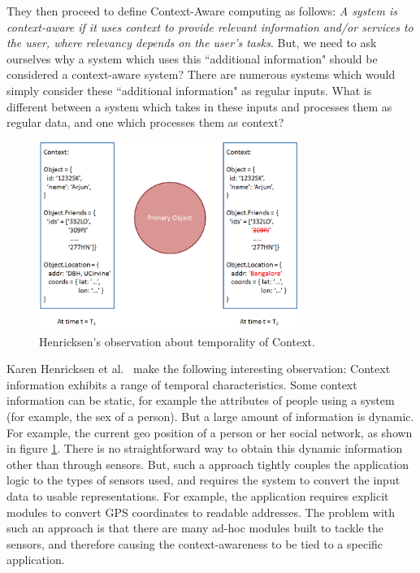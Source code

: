 They then proceed to define Context-Aware computing as follows: \textit{A system is context-aware if it uses context to provide relevant information and/or services to the user, where relevancy depends on the user's tasks}. But, we need to ask ourselves why a system which uses this ``additional information" should be considered a context-aware system? There are numerous systems which would simply consider these ``additional information" as regular inputs. What is different between a system which takes in these inputs and processes them as regular data, and one which processes them as context?

\begin{figure}[t]
\centering
\includegraphics[width=0.75\textwidth]{media/chapter2/ka-obs.png}
\caption{Henricksen's observation about temporality of Context.}
\label{fig:karen-obs}
\end{figure}

Karen Henricksen et al.\ \cite{henricksen2002modeling} make the following interesting observation: Context information exhibits a range of temporal characteristics. Some context information can be static, for example the attributes of people using a system (for example, the sex of a person). But a large amount of information is dynamic. For example, the current geo position of a person or her social network, as shown in figure \ref{fig:karen-obs}. There is no straightforward way to obtain this dynamic information other than through sensors. But, such a approach tightly couples the application logic to the types of sensors used, and requires the system to convert the input data to usable representations. For example, the application requires explicit modules to convert GPS coordinates to readable addresses. The problem with such an approach is that there are many ad-hoc modules built to tackle the sensors, and therefore causing the context-awareness to be tied to a specific application.

